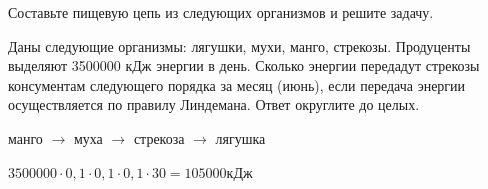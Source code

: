 
Составьте пищевую цепь из следующих организмов и решите задачу.

Даны следующие организмы: лягушки, мухи, манго, стрекозы. Продуценты выделяют 3500000 кДж энергии в день. 
Сколько энергии передадут стрекозы консументам следующего порядка за месяц (июнь), 
если передача энергии осуществляется по правилу Линдемана. Ответ округлите до целых.

\soultionSection

манго $\rightarrow$ муха $\rightarrow$ стрекоза $\rightarrow$ лягушка

$3500000 \cdot 0,1 \cdot 0,1  \cdot 0,1 \cdot 30 = 105000$кДж

